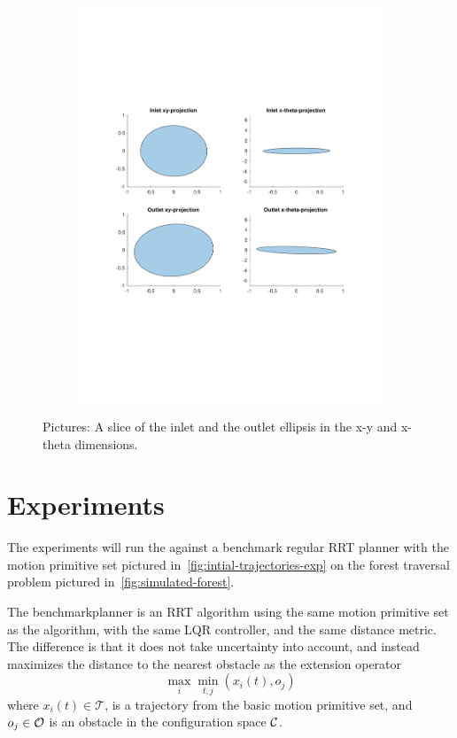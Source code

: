 \begin{figure}
\begin{subfigure}[b]{0.4\textwidth}
    \includegraphics[width=\textwidth]{figures/experiments/sos-calculation-inlet-outlet}
  \end{subfigure}
  \caption{Pictures: A slice of the inlet and the outlet ellipsis in the x-y and
    x-theta dimensions.}
\end{figure}

\section{Experiments}

The experiments will run the \rrtfunnel{} against a benchmark regular RRT
planner with the motion primitive set pictured
in~\cref{fig:intial-trajectories-exp} on the forest traversal problem pictured
in~\cref{fig:simulated-forest}.

The benchmarkplanner is an \ac{RRT} algorithm using the same motion primitive
set as the \rrtfunnel{} algorithm, with the same \ac{LQR} controller, and the
same distance metric. The difference is that it does not take uncertainty into
account, and instead maximizes the distance to the nearest obstacle as the
extension operator \ie{}
\begin{equation}
  \max_{i}\min_{t,j}(x_{i}(t), o_{j})
\end{equation}
where \(x_{i}(t) \in \mathcal{T}\), is a trajectory from the basic motion
primitive set, and \(o_{j} \in \mathcal{O}{}\) is an obstacle in the
configuration space \(\mathcal{C}{}\).

